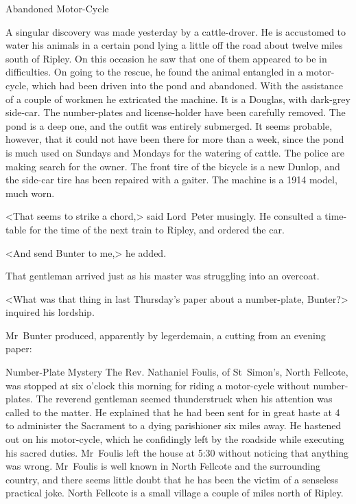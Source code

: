 \begin{newspaper}{Abandoned Motor-Cycle}

A singular discovery was made yesterday by a cattle-drover. He is accustomed to water his animals in a certain pond lying a little off the road about twelve miles south of Ripley. On this occasion he saw that one of them appeared to be in difficulties. On going to the rescue, he found the animal entangled in a motor-cycle, which had been driven into the pond and abandoned. With the assistance of a couple of workmen he extricated the machine. It is a Douglas, with dark-grey side-car. The number-plates and license-holder have been carefully removed. The pond is a deep one, and the outfit was entirely submerged. It seems probable, however, that it could not have been there for more than a week, since the pond is much used on Sundays and Mondays for the watering of cattle. The police are making search for the owner. The front tire of the bicycle is a new Dunlop, and the side-car tire has been repaired with a gaiter. The machine is a 1914 model, much worn.
\end{newspaper}

<That seems to strike a chord,> said Lord~Peter musingly. He consulted a time-table for the time of the next train to Ripley, and ordered the car.

<And send Bunter to me,> he added.

That gentleman arrived just as his master was struggling into an overcoat.

<What was that thing in last Thursday's paper about a number-plate, Bunter?> inquired his lordship.

Mr~Bunter produced, apparently by legerdemain, a cutting from an evening paper:

\pagebreak[2]


\begin{newspaper}{Number-Plate Mystery}
The Rev. Nathaniel Foulis, of St~Simon's, North Fellcote, was stopped at six o'clock this morning for riding a motor-cycle without number-plates. The reverend gentleman seemed thunderstruck when his attention was called to the matter. He explained that he had been sent for in great haste at 4  to administer the Sacrament to a dying parishioner six miles away. He hastened out on his motor-cycle, which he confidingly left by the roadside while executing his sacred duties.  Mr~Foulis left the house at 5:30 without noticing that anything was wrong. Mr~Foulis is well known in North Fellcote and the surrounding country, and there seems little doubt that he has been the victim of a senseless practical joke. North Fellcote is a small village a couple of miles north of Ripley.
\end{newspaper}

